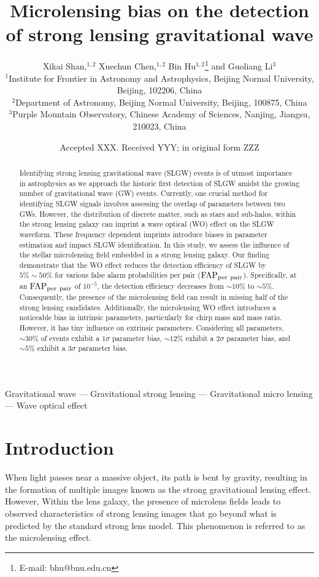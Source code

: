 \documentclass[fleqn,usenatbib]{mnras}
\title[Microlensing bias on SLGWs]{Microlensing bias on the detection of strong lensing gravitational wave}
\author[X. Shan et al.]{
Xikai Shan,$^{1,2}$
Xuechun Chen,$^{1,2}$
Bin Hu$^{1,2}$\thanks{E-mail: bhu@bnu.edu.cn}
and Guoliang Li$^{3}$
\\
$^{1}$Institute for Frontier in Astronomy and Astrophysics, Beijing Normal University, Beijing, 102206, China\\
$^{2}$Department of Astronomy, Beijing Normal University, Beijing, 100875, China\\
$^{3}$Purple Mountain Observatory, Chinese Academy of Sciences, Nanjing, Jiangsu, 210023, China}
\date{Accepted XXX. Received YYY; in original form ZZZ}
\begin{document}
\label{firstpage}
\pagerange{\pageref{firstpage}--\pageref{lastpage}}
\maketitle

\begin{abstract}
Identifying strong lensing gravitational wave (SLGW) events is of utmost importance in astrophysics as we approach the historic first detection of SLGW amidst the growing number of gravitational wave (GW) events.
Currently, one crucial method for identifying SLGW signals involves assessing the overlap of parameters between two GWs.
However, the distribution of discrete matter, such as stars and sub-halos, within the strong lensing galaxy can imprint a wave optical (WO) effect on the SLGW waveform.
These frequency dependent imprints introduce biases in parameter estimation and impact SLGW identification.
In this study, we assess the influence of the stellar microlensing field embedded in a strong lensing galaxy.
Our finding demonstrate that the WO effect reduces the detection efficiency of SLGW by $5\%\sim 50\%$ for various false alarm probabilities per pair (${\rm FAP}_{\rm per~pair}$). 
Specifically, at an ${\rm FAP}_{\rm per~pair}$ of $10^{-5}$, the detection efficiency decreases from $\sim 10\%$ to $\sim 5\%$.
Consequently, the presence of the microlensing field can result in missing half of the strong lensing candidates.
Additionally, the microlensing WO effect introduces a noticeable bias in intrinsic parameters, particularly for chirp mass and mass ratio.
However, it has tiny influence on extrinsic parameters. 
Considering all parameters, $\sim 30\%$ of events exhibit a $1\sigma$ parameter bias, $\sim 12\%$ exhibit a $2\sigma$ parameter bias, and $\sim 5\%$ exhibit a $3\sigma$ parameter bias.
\end{abstract}

\begin{keywords}
Gravitational wave --- Gravitational strong lensing --- Gravitational micro lensing --- Wave optical effect
\end{keywords}



\section{Introduction}
When light passes near a massive object, its path is bent by gravity, resulting in the formation of multiple images known as the strong gravitational lensing effect. 
However, Within the lens galaxy, the presence of microlens fields leads to observed characteristics of strong lensing images that go beyond what is predicted by the standard strong lens model. 
This phenomenon is referred to as the microlensing effect.
\end{document}
